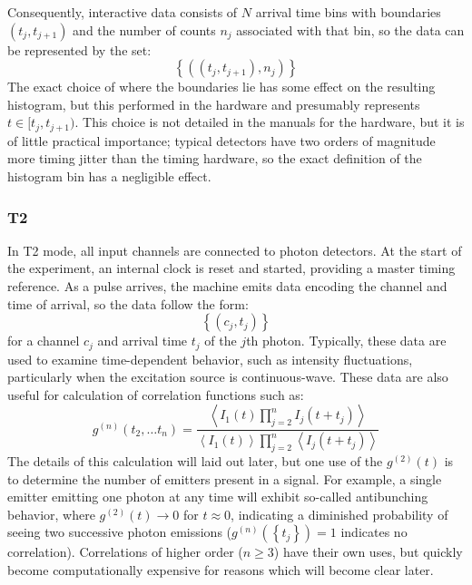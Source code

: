 \documentclass{article}
\newcommand{\braces}[1]{\ensuremath{\left\lbrace #1 \right\rbrace}}
\newcommand{\angles}[1]{\ensuremath{\left\langle #1 \right\rangle}}
\begin{document}
Consequently, interactive data consists of $N$ arrival time bins with boundaries $(t_{j}, t_{j+1})$ and the number of counts $n_{j}$ associated with that bin, so the data can be represented by the set:
\begin{equation}
\braces{((t_{j}, t_{j+1}), n_{j})}
\end{equation}
The exact choice of where the boundaries lie has some effect on the resulting histogram, but this performed in the hardware and presumably represents $t\in[t_{j}, t_{j+1})$. This choice is not detailed in the manuals for the hardware, but it is of little practical importance; typical detectors have two orders of magnitude more timing jitter than the timing hardware, so the exact definition of the histogram bin has a negligible effect.

\subsubsection{T2}
In T2 mode, all input channels are connected to photon detectors. At the start of the experiment, an internal clock is reset and started, providing a master timing reference. As a pulse arrives, the machine emits data encoding the channel and time of arrival, so the data follow the form:
\begin{equation}
\braces{(c_{j}, t_{j})}
\end{equation}
for a channel $c_{j}$ and arrival time $t_{j}$ of the $j$th photon. Typically, these data are used to examine time-dependent behavior, such as intensity fluctuations, particularly when the excitation source is continuous-wave. These data are also useful for calculation of correlation functions such as:
\begin{equation}
g^{(n)}(t_{2}, \ldots t_{n}) = \frac
	{\angles{I_{1}(t)\prod_{j=2}^{n}{I_{j}(t+t_{j})}}}
	{\angles{I_{1}(t)}\prod_{j=2}^{n}{\angles{I_{j}(t+t_{j})}}}
\end{equation}
The details of this calculation will laid out later, but one use of the $g^{(2)}(t)$ is to determine the number of emitters present in a signal. For example, a single emitter emitting one photon at any time will exhibit so-called antibunching behavior, where $g^{(2)}(t)\rightarrow 0$ for $t\approx 0$, indicating a diminished probability of seeing two successive photon emissions ($g^{(n)}(\braces{t_{j}})=1$ indicates no correlation). Correlations of higher order ($n\ge 3$) have their own uses, but quickly become computationally expensive for reasons which will become clear later.
\end{document}
